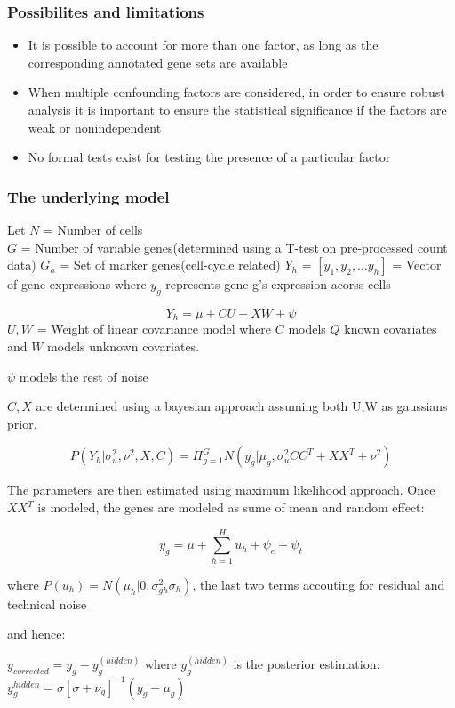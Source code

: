 \documentclass[10pt, compress]{beamer}
\renewcommand{\(}{\begin{columns}}
\renewcommand{\)}{\end{columns}}
\newcommand{\<}[1]{\begin{column}{#1}}
\renewcommand{\>}{\end{column}}
\begin{document}
\begin{frame}
\frametitle{Possibilites and limitations}
\begin{itemize}[<+- | alert@+>]
\item It is possible to account for more than one factor, as long as the corresponding annotated gene sets are available
\item When multiple confounding factors are considered, in order to ensure robust analysis it is important to ensure
the statistical significance if the factors are weak or nonindependent
\item No formal tests exist for testing the presence of a particular factor

\end{itemize}
\end{frame}


\begin{frame}%
\frametitle{The underlying model}
Let $N$ = Number of cells \\
$G$ = Number of variable genes(determined using a T-test on pre-processed count data)
$G_h$ = Set of marker genes(cell-cycle related)
$Y_h$ = $[y_1, y_2, ... y_h]$ = Vector of gene expressions  where $y_g$ represents gene g's expression acorss cells

\begin{equation}
Y_h = \mu + CU + XW + \psi
\end{equation}
$U,W$ = Weight of linear covariance model where $C$ models $Q$ known covariates and $W$ models unknown covariates.

$\psi$ models the rest of noise

$C,X$ are determined using a bayesian approach assuming both U,W as gaussians prior.

\begin{equation}
P(Y_h|\sigma_u^2, \nu^2, X, C) = \Pi_{g=1}^{G} N(y_g|\mu_g, {\sigma_u^2CC^T+XX^T+\nu^2} )
\end{equation}
\end{frame}

\begin{frame}%
The parameters are then estimated using maximum likelihood approach. Once $XX^T$ is modeled, the genes are modeled
as sume of mean and random effect:

\begin{equation}
y_g = \mu + \sum_{h=1}^Hu_h + \psi_e + \psi_t
\end{equation}

where $P(u_h)=N(\mu_h|0, \sigma_{gh}^2\sigma_h)$, the last two terms accouting for residual and technical noise

and hence:

$y_{corrected} = y_g - y_g^{(hidden)}$
where $y_g^{(hidden)}$ is the posterior estimation:
$y_g^{hidden} = \sigma[\sigma +\nu_g]^{-1}(y_g-\mu_g)$
\end{frame}
\end{document}
